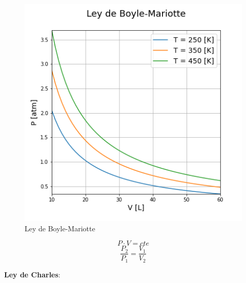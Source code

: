         \begin{minipage}{0.5\linewidth}
            \begin{figure}
               \centering
               \includegraphics[width=\textwidth]{img/graficos/ley_boyle_mariotte.png}
               \caption{Ley de Boyle-Mariotte}
               \label{fig:pv}
            \end{figure}
        \end{minipage}
        \begin{minipage}{0.4\linewidth}
            \[P \cdot V = cte\]
            \[\frac{P_{2}}{P_{1}} = \frac{V_{1}}{V_{2}}\]
        \end{minipage}
        \newline
        
        \textbf{Ley de Charles}:
        
